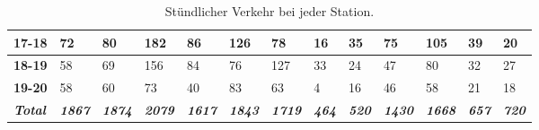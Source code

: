 \begin{table}[H]
\begin{tabular}{|l|l|l|l|l|l|l|l|l|l|l|l|l|}
\textbf{17-18}          & 72                     & 80                     & 182                    & 86                     & 126                    & 78                     & 16                    & 35                    & 75                     & 105                    & 39                    & 20                    \\ \hline
\textbf{18-19}          & 58                     & 69                     & 156                    & 84                     & 76                     & 127                    & 33                    & 24                    & 47                     & 80                     & 32                    & 27                    \\ \hline
\textbf{19-20}          & 58                     & 60                     & 73                     & 40                     & 83                     & 63                     & 4                     & 16                    & 46                     & 58                     & 21                    & 18                    \\ \hline
\textit{\textbf{Total}} & \textit{\textbf{1867}} & \textit{\textbf{1874}} & \textit{\textbf{2079}} & \textit{\textbf{1617}} & \textit{\textbf{1843}} & \textit{\textbf{1719}} & \textit{\textbf{464}} & \textit{\textbf{520}} & \textit{\textbf{1430}} & \textit{\textbf{1668}} & \textit{\textbf{657}} & \textit{\textbf{720}} \\ \hline
\end{tabular}
\caption{Stündlicher Verkehr bei jeder Station.}
\label{tstVerkehr}
\end{table}
\setlength\tabcolsep{0pt}